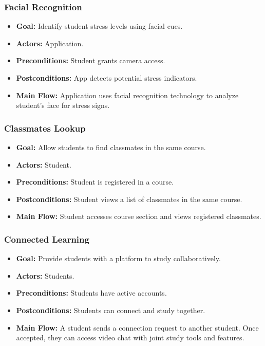 \documentclass[12pt]{article}
\begin{document}
\subsubsection{Facial Recognition}
\begin{itemize}
    \item \textbf{Goal:} Identify student stress levels using facial cues.
    \item \textbf{Actors:} Application.
    \item \textbf{Preconditions:} Student grants camera access.
    \item \textbf{Postconditions:} App detects potential stress indicators.
    \item \textbf{Main Flow:} Application uses facial recognition technology to analyze student's face for stress signs.
\end{itemize}

\subsubsection{Classmates Lookup}
\begin{itemize}
    \item \textbf{Goal:} Allow students to find classmates in the same course.
    \item \textbf{Actors:} Student.
    \item \textbf{Preconditions:} Student is registered in a course.
    \item \textbf{Postconditions:} Student views a list of classmates in the same course.
    \item \textbf{Main Flow:} Student accesses course section and views registered classmates.
\end{itemize}

\subsubsection{Connected Learning}
\begin{itemize}
    \item \textbf{Goal:} Provide students with a platform to study collaboratively.
    \item \textbf{Actors:} Students.
    \item \textbf{Preconditions:} Students have active accounts.
    \item \textbf{Postconditions:} Students can connect and study together.
    \item \textbf{Main Flow:} A student sends a connection request to another student. Once accepted, they can access video chat with joint study tools and features.
\end{itemize}
\end{document}
